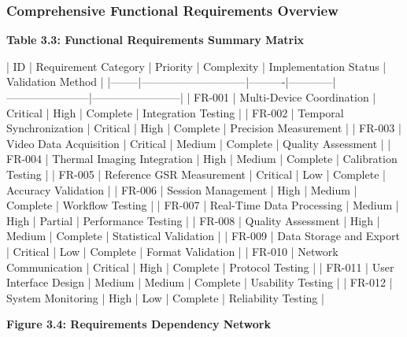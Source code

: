 \documentclass[12pt,a4paper]{report}
\begin{document}
\subsubsection{Comprehensive Functional Requirements Overview}

\textbf{Table 3.3: Functional Requirements Summary Matrix}

| ID     | Requirement Category        | Priority | Complexity | Implementation Status | Validation Method      |
|--------|-----------------------------|----------|------------|-----------------------|------------------------|
| FR-001 | Multi-Device Coordination   | Critical | High       | Complete              | Integration Testing    |
| FR-002 | Temporal Synchronization    | Critical | High       | Complete              | Precision Measurement  |
| FR-003 | Video Data Acquisition      | Critical | Medium     | Complete              | Quality Assessment     |
| FR-004 | Thermal Imaging Integration | High     | Medium     | Complete              | Calibration Testing    |
| FR-005 | Reference GSR Measurement   | Critical | Low        | Complete              | Accuracy Validation    |
| FR-006 | Session Management          | High     | Medium     | Complete              | Workflow Testing       |
| FR-007 | Real-Time Data Processing   | Medium   | High       | Partial               | Performance Testing    |
| FR-008 | Quality Assessment          | High     | Medium     | Complete              | Statistical Validation |
| FR-009 | Data Storage and Export     | Critical | Low        | Complete              | Format Validation      |
| FR-010 | Network Communication       | Critical | High       | Complete              | Protocol Testing       |
| FR-011 | User Interface Design       | Medium   | Medium     | Complete              | Usability Testing      |
| FR-012 | System Monitoring           | High     | Low        | Complete              | Reliability Testing    |

\textbf{Figure 3.4: Requirements Dependency Network}
\end{document}
